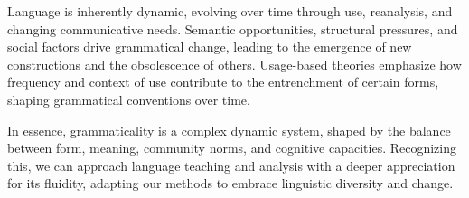 Language is inherently dynamic, evolving over time through use, reanalysis, and changing communicative needs. Semantic opportunities, structural pressures, and social factors drive grammatical change, leading to the emergence of new constructions and the obsolescence of others. Usage-based theories emphasize how frequency and context of use contribute to the entrenchment of certain forms, shaping grammatical conventions over time.

In essence, grammaticality is a complex dynamic system, shaped by the balance between form, meaning, community norms, and cognitive capacities. Recognizing this, we can approach language teaching and analysis with a deeper appreciation for its fluidity, adapting our methods to embrace linguistic diversity and change.